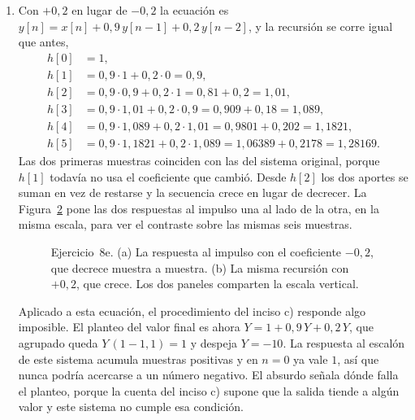 \documentclass[10pt,a4paper]{article}
\begin{document}
\begin{enumerate}
		\begin{figure}[H]
			\centering
			
			\caption{Ejercicio~8. Realización de $y[n]=x[n]+0{,}9\,y[n-1]-0{,}2\,y[n-2]$ con
			dos retardos unitarios en cascada, un escalador por cada muestra pasada de la
			salida y dos sumadores.}
			\label{fig:sol_ej8}
		\end{figure}

		\item Con $+0{,}2$ en lugar de $-0{,}2$ la
		ecuación es $y[n]=x[n]+0{,}9\,y[n-1]+0{,}2\,y[n-2]$, y la recursión se corre igual que
		antes,
		\[
			\begin{aligned}
			h[0] &= 1, \\
			h[1] &= 0{,}9\cdot 1 + 0{,}2\cdot 0 = 0{,}9, \\
			h[2] &= 0{,}9\cdot 0{,}9 + 0{,}2\cdot 1 = 0{,}81 + 0{,}2 = 1{,}01, \\
			h[3] &= 0{,}9\cdot 1{,}01 + 0{,}2\cdot 0{,}9 = 0{,}909 + 0{,}18 = 1{,}089, \\
			h[4] &= 0{,}9\cdot 1{,}089 + 0{,}2\cdot 1{,}01 = 0{,}9801 + 0{,}202 = 1{,}1821, \\
			h[5] &= 0{,}9\cdot 1{,}1821 + 0{,}2\cdot 1{,}089 = 1{,}06389 + 0{,}2178 = 1{,}28169.
			\end{aligned}
		\]
		Las dos primeras muestras coinciden con las del sistema original, porque $h[1]$
		todavía no usa el coeficiente que cambió. Desde $h[2]$ los dos aportes se suman en
		vez de restarse y la secuencia crece en lugar de decrecer. La
		Figura~\ref{fig:sol_ej8e} pone las dos respuestas al impulso una al lado de la otra,
		en la misma escala, para ver el contraste sobre las mismas seis muestras.

		\begin{figure}[H]
			\centering
			
			\caption{Ejercicio~8e. (a) La respuesta al impulso con el coeficiente $-0{,}2$,
			que decrece muestra a muestra. (b) La misma recursión con $+0{,}2$, que crece.
			Los dos paneles comparten la escala vertical.}
			\label{fig:sol_ej8e}
		\end{figure}

		Aplicado a esta ecuación, el procedimiento del inciso c) responde algo imposible. El
		planteo del valor final es ahora $Y = 1 + 0{,}9\,Y + 0{,}2\,Y$, que agrupado queda
		$Y\,(1-1{,}1)=1$ y despeja $Y=-10$. La respuesta al escalón de este sistema acumula
		muestras positivas y en $n=0$ ya vale $1$, así que nunca podría acercarse a un número
		negativo. El absurdo señala dónde falla el planteo, porque la cuenta del inciso c)
		supone que la salida tiende a algún valor y este sistema no cumple esa condición.


\end{enumerate}
\end{document}
